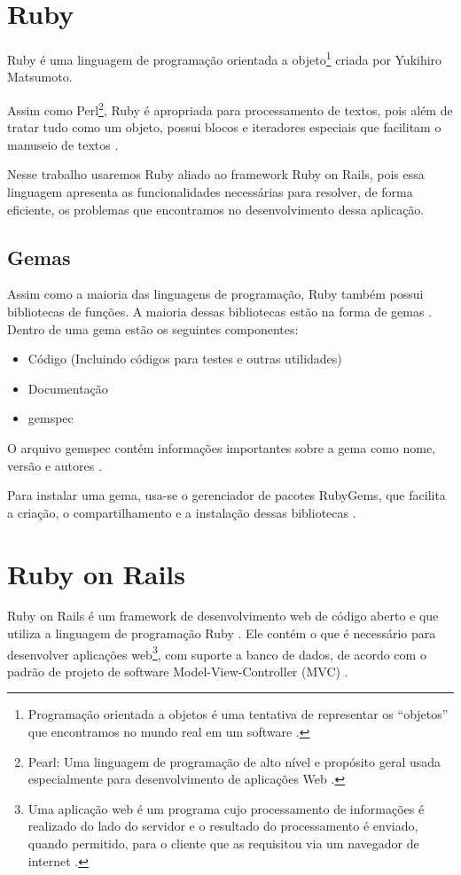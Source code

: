\section{Ruby}
\label{sec: Ruby}
Ruby é uma linguagem de programação orientada a objeto\footnote{Programação orientada a objetos é uma tentativa de representar os “objetos” que encontramos no mundo real em um software \cite{ObjectOrientedProgramming}.} criada por Yukihiro Matsumoto.

Assim como Perl\footnote{Pearl: Uma linguagem de programação de alto nível e propósito geral usada especialmente para desenvolvimento de aplicações Web \cite{PerlDef}.}, Ruby é apropriada para processamento de textos, pois além de tratar tudo como um objeto, possui blocos e iteradores especiais que facilitam o manuseio de textos \cite{RubyFAQ}.

Nesse trabalho usaremos Ruby aliado ao framework Ruby on Rails, pois essa linguagem apresenta as funcionalidades necessárias para resolver, de forma eficiente, os problemas que encontramos no desenvolvimento dessa aplicação.

    \subsection{Gemas}
    \label{subsec: Gemas}
Assim como a maioria das linguagens de programação, Ruby também possui bibliotecas de funções. A maioria dessas bibliotecas estão na forma de gemas \cite{RubyLibs}. Dentro de uma gema estão os seguintes componentes:

\begin{itemize}
    \item Código (Incluindo códigos para testes e outras utilidades)
    \item Documentação
    \item gemspec
\end{itemize}

O arquivo gemspec contém informações importantes sobre a gema como nome, versão e autores \cite{WhatIsGem}.

Para instalar uma gema, usa-se o gerenciador de pacotes RubyGems, que facilita a criação, o compartilhamento e a instalação dessas bibliotecas \cite{RubyLibs}.

\section{Ruby on Rails}
\label{sec: Rails}
Ruby on Rails é um framework de desenvolvimento web de código aberto e que utiliza a linguagem de programação Ruby \cite{RubyOnRails}. Ele contém o que é necessário para desenvolver aplicações web\footnote{Uma aplicação web é um programa cujo processamento de informações é realizado do lado do servidor e o resultado do processamento é enviado, quando permitido, para o cliente que as requisitou via um navegador de internet \cite{TechTerms}.}, com suporte a banco de dados, de acordo com o padrão de projeto de software Model-View-Controller (MVC) \cite{APIRails}.

